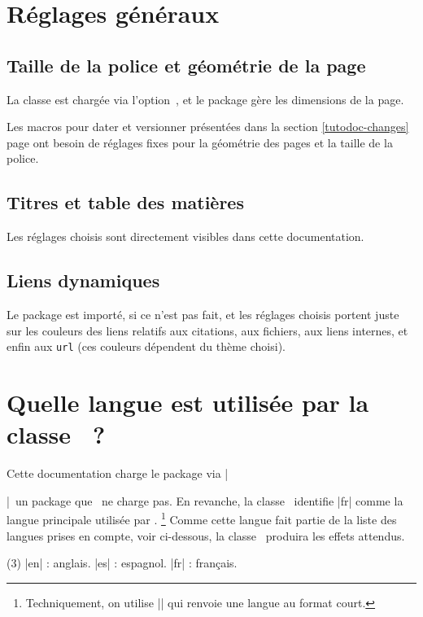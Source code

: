 \section{Réglages généraux}

\subsection{Taille de la police et géométrie de la page}

La classe  est chargée via l'option \,, et le package  gère les dimensions de la page.


\begin{tdocwarn}
	Les macros pour dater et versionner présentées dans la section \ref{tutodoc-changes} page \pageref{tutodoc-changes} ont besoin de réglages fixes pour la géométrie des pages et la taille de la police.
\end{tdocwarn}


\subsection{Titres et table des matières}

Les réglages choisis sont directement visibles dans cette documentation.


\subsection{Liens dynamiques}

Le package  est importé, si ce n'est pas fait, et les réglages choisis portent juste sur les couleurs des liens relatifs aux citations, aux fichiers, aux liens internes, et enfin aux \verb#url# (ces couleurs dépendent du thème choisi).


\section{Quelle langue est utilisée par la classe \thisproj\ ?}

Cette documentation charge le package  via \tdoclatexin|\usepackage[french]{babel}|\, un package que \thisproj\ ne charge pas.
En revanche, la classe \thisproj\ identifie \tdoclatexin|fr| comme la langue principale utilisée par .%
\footnote{
    Techniquement, on utilise \tdoclatexin|| qui renvoie une langue au format court.
}
Comme cette langue fait partie de la liste des langues prises en compte, voir ci-dessous, la classe \thisproj\ produira les effets attendus.
\begin{tasks}[label=\small\textbullet](3)
    \task \tdoclatexin|en| : anglais.
        \task \tdoclatexin|es| : espagnol.
        \task \tdoclatexin|fr| : français.
\end{tasks}


